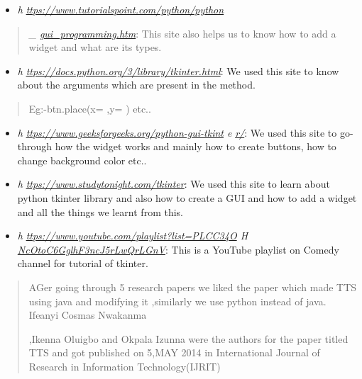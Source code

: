 \documentclass[]{article}
\begin{document}
\begin{itemize}
\item
  \emph{h}
  \href{https://www.tutorialspoint.com/python/python_gui_programming.htm}{\emph{ttps://www.tutorialspoint.com/python/python}}
\end{itemize}

\begin{quote}
\emph{\_}
\href{https://www.tutorialspoint.com/python/python_gui_programming.htm}{\emph{gui\_programming.htm}}:
This site also helps us to know how to add a widget and what are its
types.
\end{quote}

\begin{itemize}
\item
  \emph{h}
  \href{https://docs.python.org/3/library/tkinter.html}{\emph{ttps://docs.python.org/3/library/tkinter.html}}:
  We used this site to know about the arguments which are present in the
  method.
\end{itemize}

\begin{quote}
Eg:-btn.place(x= ,y= ) etc..
\end{quote}

\begin{itemize}
\item
  \emph{h}
  \emph{\href{https://www.geeksforgeeks.org/python-gui-tkinter/}{ttps://www.geeksforgeeks.org/python-gui-tkint}
  e}
  \href{https://www.geeksforgeeks.org/python-gui-tkinter/}{\emph{r/}}:
  We used this site to go-through how the widget works and mainly how to
  create buttons, how to change background color etc..
\item
  \emph{h}
  \href{https://www.studytonight.com/tkinter}{\emph{ttps://www.studytonight.com/tkinter}}:
  We used this site to learn about python tkinter library and also how
  to create a GUI and how to add a widget and all the things we learnt
  from this.
\item
  \emph{h}
  \emph{\href{https://www.youtube.com/playlist?list=PLCC34OHNcOtoC6GglhF3ncJ5rLwQrLGnV}{ttps://www.youtube.com/playlist?list=PLCC34O}
  H}
  \href{https://www.youtube.com/playlist?list=PLCC34OHNcOtoC6GglhF3ncJ5rLwQrLGnV}{\emph{NcOtoC6GglhF3ncJ5rLwQrLGnV}}:
  This is a YouTube playlist on Comedy channel for tutorial of tkinter.
\end{itemize}

\begin{quote}
AGer going through 5 research papers we liked the paper which made TTS
using java and modifying it ,similarly we use python instead of java.
Ifeanyi Cosmas Nwakanma

,Ikenna Oluigbo and Okpala Izunna were the authors for the paper titled
TTS and got published on 5,MAY 2014 in International Journal of Research
in Information Technology(IJRIT)
\end{quote}
\end{document}
